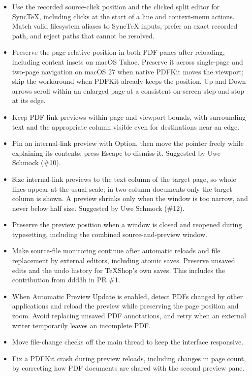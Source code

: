 \documentclass[11pt,letterpaper]{article}
\begin{document}
\begin{itemize}
\item Use the recorded source-click position and the clicked split editor for SyncTeX, including clicks at the start of a line and context-menu actions. Match valid filesystem aliases to SyncTeX inputs, prefer an exact recorded path, and reject paths that cannot be resolved.
\item Preserve the page-relative position in both PDF panes after reloading, including content insets on macOS Tahoe. Preserve it across single-page and two-page navigation on macOS 27 when native PDFKit moves the viewport; skip the workaround when PDFKit already keeps the position. Up and Down arrows scroll within an enlarged page at a consistent on-screen step and stop at its edge.
\item Keep PDF link previews within page and viewport bounds, with surrounding text and the appropriate column visible even for destinations near an edge.
\item Pin an internal-link preview with Option, then move the pointer freely while explaining its contents; press Escape to dismiss it. Suggested by Uwe Schmock (\#10).
\item Size internal-link previews to the text column of the target page, so whole lines appear at the usual scale; in two-column documents only the target column is shown. A preview shrinks only when the window is too narrow, and never below half size. Suggested by Uwe Schmock (\#12).
\item Preserve the preview position when a window is closed and reopened during typesetting, including the combined source-and-preview window.
\item Make source-file monitoring continue after automatic reloads and file replacement by external editors, including atomic saves. Preserve unsaved edits and the undo history for TeXShop’s own saves. This includes the contribution from ddd3h in PR \#1.
\item When Automatic Preview Update is enabled, detect PDFs changed by other applications and reload the preview while preserving the page position and zoom. Avoid replacing unsaved PDF annotations, and retry when an external writer temporarily leaves an incomplete PDF.
\item Move file-change checks off the main thread to keep the interface responsive.
\item Fix a PDFKit crash during preview reloads, including changes in page count, by correcting how PDF documents are shared with the second preview pane.

\end{itemize}
\end{document}
